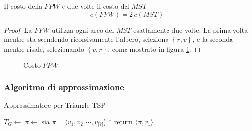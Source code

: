 \begin{proposizione}
    \label{prop:costofpw}
    Il costo della $FPW$ è due volte il costo del $MST$
    \begin{equation*}
        c(FPW) = 2 \, c(MST)
    \end{equation*}
    \begin{proof}
        La $FPW$ utilizza ogni arco del $MST$ esattamente due volte. La prima volta mentre sta scendendo ricorsivamente l'albero, seleziona $\left\{ r,v \right\}$, e la seconda mentre risale, selezionando $\left\{ v,r \right\}$, come mostrato in figura \ref{fig:fpwcost}.
    \end{proof}
\end{proposizione}
\begin{figure}[ht]
    \centering
    \caption{Costo $FPW$}
    \label{fig:fpwcost}
\end{figure}

\subsubsection{Algoritmo di approssimazione}
\begin{algorithm}[H]
\caption{Approssimatore per Triangle TSP}\label{alg:approxttsp}
\begin{algorithmic}[1]
        \State $T_G \gets$ 
        \State $\pi \gets$ 
        \State * sia $\pi = \langle v_1, v_2, \cdots, v_{|V|}\rangle $ *
        \State return $\langle \pi, v_1 \rangle $
    \EndProcedure
\end{algorithmic}
\end{algorithm}

